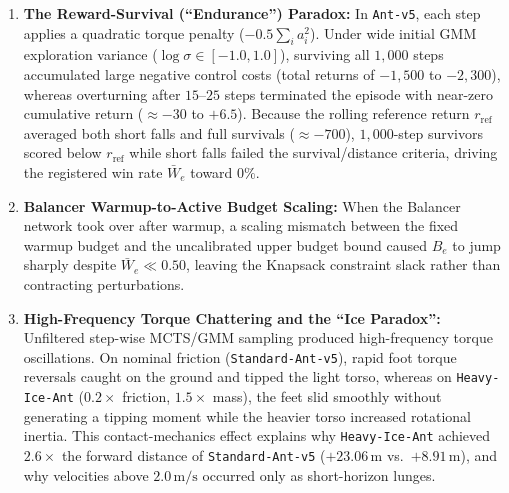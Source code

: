 \documentclass[11pt,a4paper]{article}
\begin{document}
\begin{enumerate}
    \item \textbf{The Reward-Survival (``Endurance'') Paradox:} In \texttt{Ant-v5}, each step applies a quadratic torque penalty ($-0.5 \sum_i a_i^2$). Under wide initial GMM exploration variance ($\log \sigma \in [-1.0, 1.0]$), surviving all $1,000$ steps accumulated large negative control costs (total returns of $-1,500$ to $-2,300$), whereas overturning after $15\text{--}25$ steps terminated the episode with near-zero cumulative return ($\approx -30$ to $+6.5$). Because the rolling reference return $r_{\text{ref}}$ averaged both short falls and full survivals ($\approx -700$), $1,000$-step survivors scored below $r_{\text{ref}}$ while short falls failed the survival/distance criteria, driving the registered win rate $\bar{W}_e$ toward $0\%$.
    \item \textbf{Balancer Warmup-to-Active Budget Scaling:} When the Balancer network took over after warmup, a scaling mismatch between the fixed warmup budget and the uncalibrated upper budget bound caused $B_e$ to jump sharply despite $\bar{W}_e \ll 0.50$, leaving the Knapsack constraint slack rather than contracting perturbations.
    \item \textbf{High-Frequency Torque Chattering and the ``Ice Paradox'':} Unfiltered step-wise MCTS/GMM sampling produced high-frequency torque oscillations. On nominal friction (\texttt{Standard-Ant-v5}), rapid foot torque reversals caught on the ground and tipped the light torso, whereas on \texttt{Heavy-Ice-Ant} ($0.2\times$ friction, $1.5\times$ mass), the feet slid smoothly without generating a tipping moment while the heavier torso increased rotational inertia. This contact-mechanics effect explains why \texttt{Heavy-Ice-Ant} achieved $2.6\times$ the forward distance of \texttt{Standard-Ant-v5} ($+23.06\,\text{m}$ vs.~$+8.91\,\text{m}$), and why velocities above $2.0\,\text{m/s}$ occurred only as short-horizon lunges.
\end{enumerate}
\end{document}
